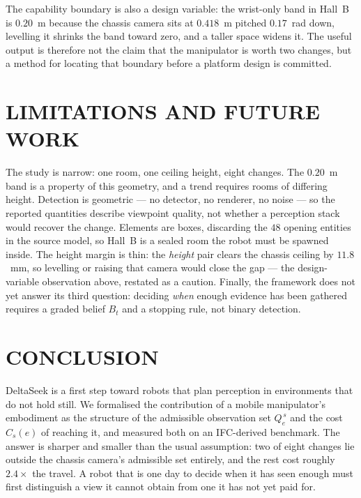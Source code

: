 \documentclass[letterpaper, 10 pt, conference]{ieeeconf}
\begin{document}
The capability boundary is also a design variable: the wrist-only band in
Hall~B is $0.20$~m because the chassis camera sits at $0.418$~m pitched
$0.17$~rad down, levelling it shrinks the band toward zero, and a taller space
widens it. The useful output is therefore not the claim that the manipulator is
worth two changes, but a method for locating that boundary before a platform
design is committed.

\section{LIMITATIONS AND FUTURE WORK}

The study is narrow: one room, one ceiling height, eight changes. The $0.20$~m
band is a property of this geometry, and a trend requires rooms of differing
height. Detection is geometric --- no detector, no renderer, no noise --- so
the reported quantities describe viewpoint quality, not whether a perception
stack would recover the change. Elements are boxes, discarding the $48$ opening
entities in the source model, so Hall~B is a sealed room the robot must be
spawned inside. The height margin is thin: the \emph{height} pair clears the
chassis ceiling by $11.8$~mm, so levelling or raising that camera would close
the gap --- the design-variable observation above, restated as a caution.
Finally, the framework does not yet answer its third question: deciding
\emph{when} enough evidence has been gathered requires a graded belief $B_t$
and a stopping rule, not binary detection.

\section{CONCLUSION}

DeltaSeek is a first step toward robots that plan perception in environments
that do not hold still. We formalised the contribution of a mobile
manipulator's embodiment as the structure of the admissible observation set
$Q_e^{\,s}$ and the cost $C_s(e)$ of reaching it, and measured both on an
IFC-derived benchmark. The answer is sharper and smaller than the usual
assumption: two of eight changes lie outside the chassis camera's admissible
set entirely, and the rest cost roughly $2.4\times$ the travel. A robot that is
one day to decide when it has seen enough must first distinguish a view it
cannot obtain from one it has not yet paid for.
\end{document}
